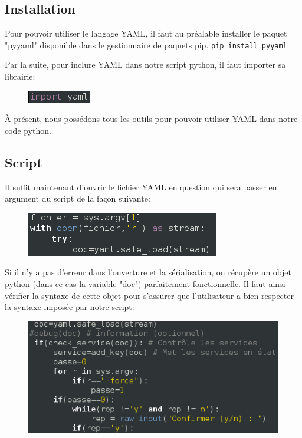 \documentclass[a4paper,11pt]{article}
\begin{document}
\subsection{Installation}
\label{sub:4.3}

Pour pouvoir utiliser le langage YAML, il faut au préalable installer le paquet "pyyaml" disponible dans le gestionnaire de paquets pip.
\smallbreak
\verb?pip install pyyaml?

Par la suite, pour inclure YAML dans notre script python, il faut importer sa librairie:
\smallbreak
\begin{figure}[hbtp]
\centering
\includegraphics[scale=0.7]{import_yaml.png}
\end{figure}
\smallbreak

À présent, nous possédons tous les outils pour pouvoir utiliser YAML dans notre code python.

\subsection{Script}
\label{sub:4.4}

Il suffit maintenant d'ouvrir le fichier YAML en question qui sera passer en argument du script de la façon suivante:
\smallbreak
\begin{figure}[hbtp]
\centering
\includegraphics[scale=0.7]{recup_yaml.png}
\end{figure}
\smallbreak

Si il n'y a pas d'erreur dans l'ouverture et la sérialisation, on récupère un objet python (dans ce cas la variable "doc") parfaitement fonctionnelle. 
\smallbreak
Il faut ainsi vérifier la syntaxe de cette objet pour s'assurer que l'utilisateur a bien respecter la syntaxe imposée par notre script:

\smallbreak
\begin{figure}[hbtp]
\centering
\includegraphics[scale=0.7]{controle_yaml.png}
\end{figure}
\smallbreak
\end{document}
